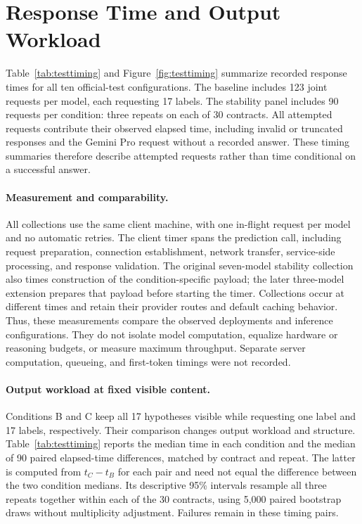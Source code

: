 \section{Response Time and Output Workload}
\label{app:timing}

Table~\ref{tab:testtiming} and Figure~\ref{fig:testtiming} summarize recorded response times for all ten official-test configurations. The baseline includes 123 joint requests per model, each requesting 17 labels. The stability panel includes 90 requests per condition: three repeats on each of 30 contracts. All attempted requests contribute their observed elapsed time, including invalid or truncated responses and the Gemini Pro request without a recorded answer. These timing summaries therefore describe attempted requests rather than time conditional on a successful answer.

\paragraph{Measurement and comparability.}
All collections use the same client machine, with one in-flight request per model and no automatic retries. The client timer spans the prediction call, including request preparation, connection establishment, network transfer, service-side processing, and response validation. The original seven-model stability collection also times construction of the condition-specific payload; the later three-model extension prepares that payload before starting the timer. Collections occur at different times and retain their provider routes and default caching behavior. Thus, these measurements compare the observed deployments and inference configurations. They do not isolate model computation, equalize hardware or reasoning budgets, or measure maximum throughput. Separate server computation, queueing, and first-token timings were not recorded.

\paragraph{Output workload at fixed visible content.}
Conditions B and C keep all 17 hypotheses visible while requesting one label and 17 labels, respectively. Their comparison changes output workload and structure. Table~\ref{tab:testtiming} reports the median time in each condition and the median of 90 paired elapsed-time differences, matched by contract and repeat. The latter is computed from $t_C-t_B$ for each pair and need not equal the difference between the two condition medians. Its descriptive 95\% intervals resample all three repeats together within each of the 30 contracts, using 5,000 paired bootstrap draws without multiplicity adjustment. Failures remain in these timing pairs.

